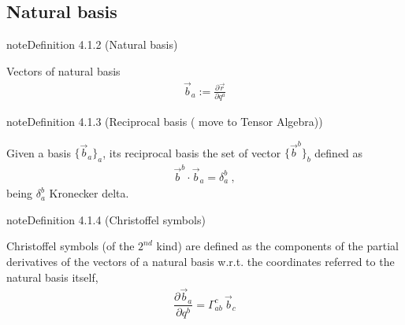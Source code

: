 \documentclass[letterpaper,10pt,english]{jupyterBook}
\begin{document}
\subsection{Natural basis}
\label{\detokenize{ch/tensor-algebra-calculus/calculus-euclidean:natural-basis}}\label{\detokenize{ch/tensor-algebra-calculus/calculus-euclidean:tensor-calculus-coordinates-natural-basis}}\label{ch/tensor-algebra-calculus/calculus-euclidean:definition-1}
\begin{sphinxadmonition}{note}{Definition 4.1.2 (Natural basis)}



\sphinxAtStartPar
Vectors of natural basis
\begin{equation*}
\begin{split}\vec{b}_a := \frac{\partial \vec{r}}{\partial q^a}\end{split}
\end{equation*}\end{sphinxadmonition}
\label{ch/tensor-algebra-calculus/calculus-euclidean:definition-2}
\begin{sphinxadmonition}{note}{Definition 4.1.3 (Reciprocal basis ( move to Tensor Algebra))}



\sphinxAtStartPar
Given a basis \(\{ \vec{b}_a \}_{a}\), its reciprocal basis the set of vector \(\{ \vec{b}^b \}_b\) defined as
\begin{equation*}
\begin{split}\vec{b}^b \cdot \vec{b}_a = \delta_{a}^b \ ,\end{split}
\end{equation*}
\sphinxAtStartPar
being \(\delta_a^b\) Kronecker delta.
\end{sphinxadmonition}
\label{ch/tensor-algebra-calculus/calculus-euclidean:definition-3}
\begin{sphinxadmonition}{note}{Definition 4.1.4 (Christoffel symbols)}



\sphinxAtStartPar
Christoffel symbols (of the \(2^{nd}\) kind) are defined as the components of the partial derivatives of the vectors of a natural basis w.r.t. the coordinates referred to the natural basis itself,
\begin{equation}\label{equation:ch/tensor-algebra-calculus/calculus-euclidean:def:christoffel:2}
\begin{split}\dfrac{\partial \vec{b}_a}{\partial q^b} = \Gamma_{ab}^c \, \vec{b}_c\end{split}
\end{equation}\end{sphinxadmonition}
\end{document}
